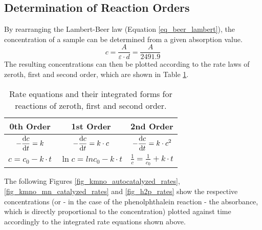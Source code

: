 \documentclass[titlepage]{article}
\begin{document}
\subsection{Determination of Reaction Orders}
By rearranging the Lambert-Beer law (Equation \ref{eq_beer_lambert}), the concentration of a sample can be determined from a given absorption value.
%
\begin{equation} \label{eq_concentration_from_attenuation}
    c = \frac{A}{\varepsilon \cdot d} = \frac{A}{2491.9}
\end{equation}
%
The resulting concentrations can then be plotted according to the rate laws of zeroth, first and second order, which are shown in Table \ref{tb_rate_laws}.
%
\begin{table}[H]
    \centering
    \caption{Rate equations and their integrated forms for reactions of zeroth, first and second order.}
    \label{tb_rate_laws}
    \begin{tabular}{|c|c|c|}
        \hline
        \textbf{0th Order} & \textbf{1st Order} & \textbf{2nd Order}
        \\
        \hline
        \(\displaystyle -\odv{c}{t} = k\) & \(\displaystyle -\odv{c}{t} = k \cdot c\) & \(\displaystyle -\odv{c}{t} = k \cdot c^2\)
        \\
        \hline
        \(\displaystyle c = c_0 - k \cdot t\) & \(\displaystyle \ln{c} = ln{c_0} - k \cdot t\) & \(\displaystyle \frac{1}{c} = \frac{1}{c_0} + k \cdot t\)
        \\
        \hline
    \end{tabular}
\end{table}
%
\noindent The following Figures \ref{fig_kmno_autocatalyzed_rates}, \ref{fig_kmno_mn_catalyzed_rates} and \ref{fig_h2p_rates} show the respective concentrations (or - in the case of the phenolphthalein reaction - the absorbance, which is directly proportional to the concentration) plotted against time accordingly to the integrated rate equations shown above.
\end{document}
